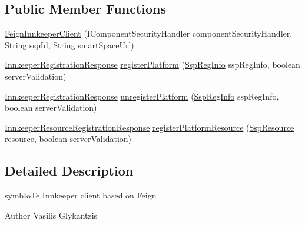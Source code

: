 \subsection*{Public Member Functions}
\begin{DoxyCompactItemize}
\item 
\hyperlink{classeu_1_1h2020_1_1symbiote_1_1client_1_1ssp_1_1feign_1_1FeignInnkeeperClient_a279bdba40af7b59e623847f723e4fb65}{Feign\+Innkeeper\+Client} (I\+Component\+Security\+Handler component\+Security\+Handler, String ssp\+Id, String smart\+Space\+Url)
\item 
\hyperlink{classeu_1_1h2020_1_1symbiote_1_1ssp_1_1model_1_1InnkeeperRegistrationResponse}{Innkeeper\+Registration\+Response} \hyperlink{classeu_1_1h2020_1_1symbiote_1_1client_1_1ssp_1_1feign_1_1FeignInnkeeperClient_accc275f13540afa62808f9cd03e94d12}{register\+Platform} (\hyperlink{classeu_1_1h2020_1_1symbiote_1_1cloud_1_1model_1_1ssp_1_1SspRegInfo}{Ssp\+Reg\+Info} ssp\+Reg\+Info, boolean server\+Validation)
\item 
\hyperlink{classeu_1_1h2020_1_1symbiote_1_1ssp_1_1model_1_1InnkeeperRegistrationResponse}{Innkeeper\+Registration\+Response} \hyperlink{classeu_1_1h2020_1_1symbiote_1_1client_1_1ssp_1_1feign_1_1FeignInnkeeperClient_a33938dd37e6685401225996fc783ea15}{unregister\+Platform} (\hyperlink{classeu_1_1h2020_1_1symbiote_1_1cloud_1_1model_1_1ssp_1_1SspRegInfo}{Ssp\+Reg\+Info} ssp\+Reg\+Info, boolean server\+Validation)
\item 
\hyperlink{classeu_1_1h2020_1_1symbiote_1_1ssp_1_1model_1_1InnkeeperResourceRegistrationResponse}{Innkeeper\+Resource\+Registration\+Response} \hyperlink{classeu_1_1h2020_1_1symbiote_1_1client_1_1ssp_1_1feign_1_1FeignInnkeeperClient_ac6576ba5db1d2317917ec0d7237e63f1}{register\+Platform\+Resource} (\hyperlink{classeu_1_1h2020_1_1symbiote_1_1cloud_1_1model_1_1ssp_1_1SspResource}{Ssp\+Resource} resource, boolean server\+Validation)
\end{DoxyCompactItemize}


\subsection{Detailed Description}
symb\+Io\+Te Innkeeper client based on Feign

\begin{DoxyAuthor}{Author}
Vasilis Glykantzis 
\end{DoxyAuthor}


